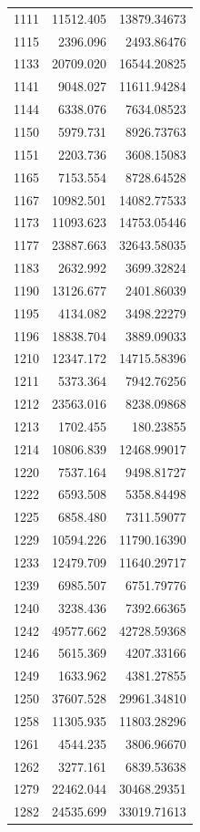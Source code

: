 \documentclass[
  12pt,
]{article}
\begin{document}
\begin{longtable}[]{@{}lrr@{}}
1111 & 11512.405 & 13879.34673 \\
1115 & 2396.096 & 2493.86476 \\
1133 & 20709.020 & 16544.20825 \\
1141 & 9048.027 & 11611.94284 \\
1144 & 6338.076 & 7634.08523 \\
1150 & 5979.731 & 8926.73763 \\
1151 & 2203.736 & 3608.15083 \\
1165 & 7153.554 & 8728.64528 \\
1167 & 10982.501 & 14082.77533 \\
1173 & 11093.623 & 14753.05446 \\
1177 & 23887.663 & 32643.58035 \\
1183 & 2632.992 & 3699.32824 \\
1190 & 13126.677 & 2401.86039 \\
1195 & 4134.082 & 3498.22279 \\
1196 & 18838.704 & 3889.09033 \\
1210 & 12347.172 & 14715.58396 \\
1211 & 5373.364 & 7942.76256 \\
1212 & 23563.016 & 8238.09868 \\
1213 & 1702.455 & 180.23855 \\
1214 & 10806.839 & 12468.99017 \\
1220 & 7537.164 & 9498.81727 \\
1222 & 6593.508 & 5358.84498 \\
1225 & 6858.480 & 7311.59077 \\
1229 & 10594.226 & 11790.16390 \\
1233 & 12479.709 & 11640.29717 \\
1239 & 6985.507 & 6751.79776 \\
1240 & 3238.436 & 7392.66365 \\
1242 & 49577.662 & 42728.59368 \\
1246 & 5615.369 & 4207.33166 \\
1249 & 1633.962 & 4381.27855 \\
1250 & 37607.528 & 29961.34810 \\
1258 & 11305.935 & 11803.28296 \\
1261 & 4544.235 & 3806.96670 \\
1262 & 3277.161 & 6839.53638 \\
1279 & 22462.044 & 30468.29351 \\
1282 & 24535.699 & 33019.71613 \\

\end{longtable}
\end{document}
